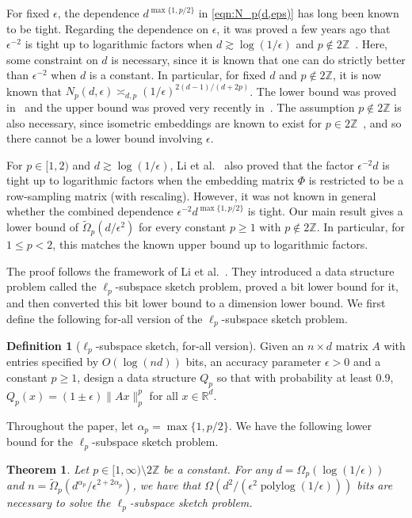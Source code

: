 \documentclass[11pt]{article}
\newtheorem{theorem}{Theorem}[section]
\theoremstyle{remark}
\theoremstyle{definition}
\newtheorem{definition}{Definition}
\newcommand{\R}{\mathbb{R}}
\newcommand{\Z}{\mathbb{Z}}
\newcommand{\eps}{\epsilon}
\DeclareMathOperator{\polylog}{polylog}
\begin{document}
For fixed $\eps$, the dependence $d^{\max\{1,p/2\}}$ in \eqref{eqn:N_p(d,eps)} has long been known to be tight. Regarding the dependence on $\eps$, it was proved a few years ago that $\eps^{-2}$ is tight up to logarithmic factors when $d\gtrsim \log(1/\eps)$ and $p\not\in 2\Z$~\cite{LWW21}. Here, some constraint on $d$ is necessary, since it is known that one can do strictly better than $\eps^{-2}$ when $d$ is a constant. In particular, for fixed $d$ and $p\not\in 2\Z$, it is now known that $N_p(d,\eps) \asymp_{d,p} (1/\eps)^{2(d-1)/(d+2p)}$. The lower bound was proved in~\cite{LLW23} and the upper bound was proved very recently in~\cite{L26:const_dim}. The assumption $p\not\in 2\Z$ is also necessary, since isometric embeddings are known to exist for $p\in 2\Z$~\cite{handbook:21}, and so there cannot be a lower bound involving $\eps$.

For $p\in[1,2)$ and $d\gtrsim \log(1/\eps)$, Li et al.~\cite{LWW21} also proved that the factor $\eps^{-2}d$ is tight up to logarithmic factors when the embedding matrix $\Phi$ is restricted to be a row-sampling matrix (with rescaling).
However, it was not known in general whether the combined dependence $\eps^{-2}d^{\max\{1,p/2\}}$ is tight. Our main result gives a lower bound of $\widetilde{\Omega}_p(d/\eps^2)$ for every constant $p\geq 1$ with $p\notin 2\mathbb{Z}$. In particular, for $1\leq p<2$, this matches the known upper bound up to logarithmic factors.

The proof follows the framework of Li et al.~\cite{LWW21}. They introduced a data structure problem called the $\ell_p$-subspace sketch problem, proved a bit lower bound for it, and then converted this bit lower bound to a dimension lower bound. We first define the following for-all version of the $\ell_p$-subspace sketch problem.
\begin{definition}[$\ell_p$-subspace sketch, for-all version]
	Given an $n\times d$ matrix $A$ with entries specified by $O(\log(nd))$ bits,
	an accuracy parameter $\eps  > 0$ and a constant $p\geq 1$, design a data structure
	$Q_p$ so that with probability at least 0.9, $Q_p(x) = (1 \pm  \eps)\|Ax\|_p^p$ for all $x \in \R^d$.
\end{definition}

Throughout the paper, let $\alpha_p=\max\{1,p/2\}$. We have the following lower bound for the $\ell_p$-subspace sketch problem.

\begin{theorem}\label{thm:subspace_sketch_lower_bound}
	Let $p \in  [1, \infty) \setminus 
	2\mathbb{Z}$ be a constant. For any
	$d = \Omega_p(\log(1/\eps))$ and
	$n = \widetilde\Omega_p(d^{\alpha_p}/\eps^{2+2\alpha_p})$, we have that $\Omega(d^2/(\eps^2\polylog(1/\eps)))$ bits are necessary to solve the $\ell_p$-subspace sketch problem.
\end{theorem}
\end{document}
